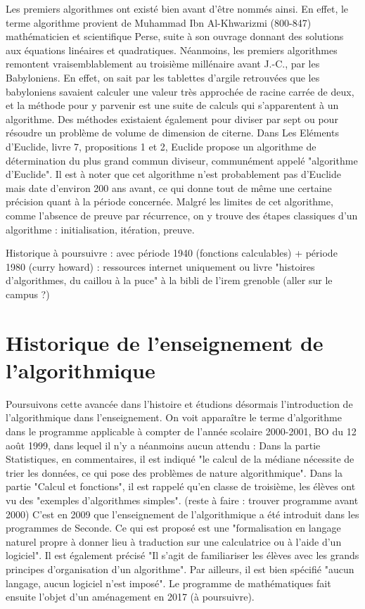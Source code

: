 \documentclass[a4paper, 12pt, appendixprefix=true]{scrreprt}%
\begin{document}
Les premiers algorithmes ont existé bien avant d'être nommés ainsi.
En effet, le terme algorithme provient de Muhammad Ibn Al-Khwarizmi (800-847) mathématicien et scientifique Perse, suite à son ouvrage donnant des solutions aux équations linéaires et quadratiques. Néanmoins, les premiers algorithmes remontent vraisemblablement au troisième millénaire avant J.-C., par les Babyloniens. En effet, on sait par les tablettes d'argile retrouvées que les babyloniens savaient calculer une valeur très approchée de racine carrée de deux, et la méthode pour y parvenir est une suite de calculs qui s'apparentent à un algorithme. Des méthodes existaient également pour diviser par sept ou pour résoudre un problème de volume de dimension de citerne.
Dans Les Eléments d'Euclide, livre 7, propositions 1 et 2, Euclide propose un algorithme de détermination du plus grand commun diviseur, communément appelé "algorithme d'Euclide". Il est à noter que cet algorithme n'est probablement pas d'Euclide mais date d'environ 200 ans avant, ce qui donne tout de même une certaine précision quant à la période concernée. Malgré les limites de cet algorithme, comme l'absence de preuve par récurrence, on y trouve des étapes classiques d'un algorithme : initialisation, itération, preuve.

Historique à poursuivre : avec période 1940 (fonctions calculables) + période 1980 (curry howard)
: ressources internet uniquement ou livre "histoires d'algorithmes, du caillou à la puce" à la bibli de l'irem grenoble (aller sur le campus ?)

\section{Historique de l'enseignement de l'algorithmique}
Poursuivons cette avancée dans l'histoire et étudions désormais l'introduction de l'algorithmique dans l'enseignement.
On voit apparaître le terme d'algorithme dans le programme applicable à compter de l'année scolaire 2000-2001, BO du 12 août 1999, dans lequel il n'y a néanmoins aucun attendu : 
Dans la partie Statistiques, en commentaires, il est indiqué "le calcul de la médiane nécessite de trier les données, ce qui pose des problèmes de nature algorithmique".
Dans la partie "Calcul et fonctions", il est rappelé qu'en classe de troisième, les élèves ont vu des "exemples d'algorithmes simples".
(reste à faire : trouver programme avant 2000)
C'est en 2009 que l'enseignement de l'algorithmique a été introduit dans les programmes de Seconde.
Ce qui est proposé est une "formalisation en langage naturel propre à donner lieu à traduction sur une calculatrice ou à l'aide d'un logiciel". Il est également précisé "Il s'agit de familiariser les élèves avec les grands principes d'organisation d'un algorithme". Par ailleurs, il est bien spécifié "aucun langage, aucun logiciel n'est imposé".
Le programme de mathématiques fait ensuite l'objet d'un aménagement en 2017 (à poursuivre).
\end{document}

